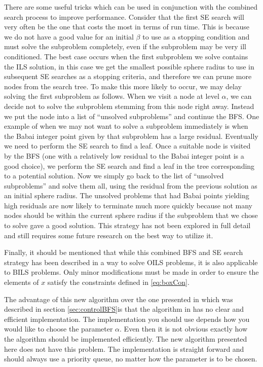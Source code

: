 \documentclass[12pt,Bold,letterpaper]{mcgilletdclass}
\begin{document}
There are some useful tricks which can be used in conjunction with the combined search process to improve performance. Consider that the first SE search will very often be the one that costs the most in terms of run time. This is because we do not have a good value for an initial $\beta$ to use as a stopping condition and must solve the subproblem completely, even if the subproblem may be very ill conditioned. The best case occurs when the first subproblem we solve contains the ILS solution, in this case we get the smallest possible sphere radius to use in subsequent SE searches as a stopping criteria, and therefore we can prune more nodes from the search tree. To make this more likely to occur, we may delay solving the first subproblem as follows. When we visit a node at level $\alpha$, we can decide not to solve the subproblem stemming from this node right away. Instead we put the node into a list of ``unsolved subproblems'' and continue the BFS. One example of when we may not want to solve a subproblem immediately is when the Babai integer point given by that subproblem has a large residual. Eventually we need to perform the SE search to find a leaf. Once a suitable node is visited by the BFS (one with a relatively low residual to the Babai integer point is a good choice), we perform the SE search and find a leaf in the tree corresponding to a potential solution. Now we simply go back to the list of ``unsolved subproblems'' and solve them all, using the residual from the previous solution as an initial sphere radius. The unsolved problems that had Babai points yielding high residuals are now likely to terminate much more quickly because not many nodes should be within the current sphere radius if the subproblem that we chose to solve gave a good solution. This strategy has not been explored in full detail and still requires some future research on the best way to utilize it.

Finally, it should be mentioned that while this combined BFS and SE search strategy has been described in a way to solve OILS problems, it is also applicable to BILS problems. Only minor modifications must be made in order to ensure the elements of $x$ satisfy the constraints defined in \eqref{eq:boxCon}.

The advantage of this new algorithm over the one presented in \cite{StuBF07} which was described in section \ref{sec:controlBFS}is that the algorithm in \cite{StuBF07} has no clear and efficient implementation. The implementation you should use depends how you would like to choose the parameter $\alpha$. Even then it is not obvious exactly how the algorithm should be implemented efficiently. The new algorithm presented here does not have this problem. The implementation is straight forward and should always use a priority queue, no matter how the parameter is to be chosen.
\end{document}
